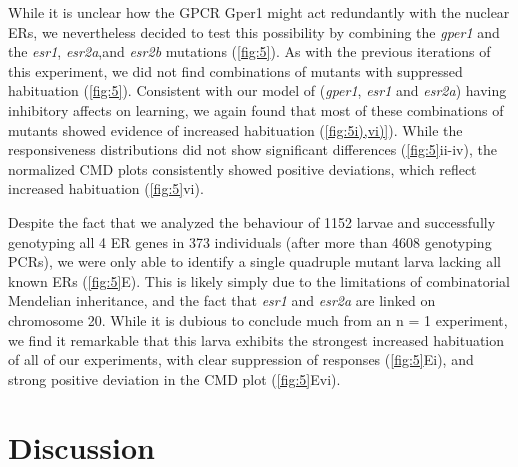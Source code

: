 \documentclass[9pt,lineno]{RandlettLab_elife}
\begin{document}
{\begin{figure}
\begin{fullwidth}
\begin{center}
\label{fig:5}
\end{center}
\end{fullwidth}
\end{figure}


While it is unclear how the GPCR Gper1 might act redundantly with the nuclear ERs, we nevertheless decided to test this possibility by combining the \emph{gper1} and the \emph{esr1}, \emph{esr2a},and \emph{esr2b} mutations (\autoref{fig:5}). 
As with the previous iterations of this experiment, we did not find combinations of mutants with suppressed habituation (\autoref{fig:5}). 
Consistent with our model of (\emph{gper1}, \emph{esr1} and \emph{esr2a}) having inhibitory affects on learning, we again found that most of these combinations of mutants showed evidence of increased habituation (\autoref{fig:5i),vi)}).
While the  responsiveness distributions did not show significant differences (\autoref{fig:5}ii-iv), the normalized CMD plots consistently showed positive deviations, which reflect increased habituation (\autoref{fig:5}vi).

Despite the fact that we analyzed the behaviour of 1152 larvae and successfully genotyping all 4 ER genes in 373 individuals (after more than 4608 genotyping PCRs), we were only able to identify a single quadruple mutant larva lacking all known ERs (\autoref{fig:5}E). 
This is likely simply due to the limitations of combinatorial Mendelian inheritance, and the fact that \emph{esr1} and \emph{esr2a} are linked on chromosome 20.   
While it is dubious to conclude much from an n = 1 experiment, we find it remarkable that this larva exhibits the strongest increased habituation of all of our experiments, with clear suppression of responses (\autoref{fig:5}Ei), and strong positive deviation in the CMD plot (\autoref{fig:5}Evi). 


\section{Discussion}

}
\end{document}
